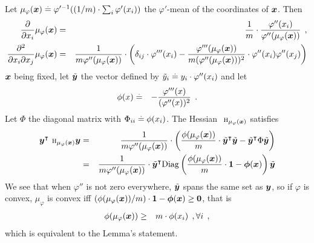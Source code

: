 Let $\mu_\varphi(\bm{x}) \stackrel{\mathrm{.}}{=} \varphi'^{-1}((1/m)\cdot \sum_i
\varphi'(x_i))$ the $\varphi'$-mean of the coordinates of
$\bm{x}$. Then
\begin{eqnarray}
\frac{\partial}{\partial x_i} \mu_\varphi(\bm{x}) & = &
\frac{1}{m}\cdot
\frac{\varphi''(x_i)}{\varphi''(\mu_\varphi(\bm{x}))}\:\:,\\
\frac{\partial^2}{\partial x_i \partial x_j} \mu_\varphi(\bm{x}) & = &
\frac{1}{m \varphi''(\mu_\varphi(\bm{x}))}\cdot \left(\delta_{ij}\cdot
  \varphi'''(x_i)-
  \frac{\varphi'''(\mu_\varphi(\bm{x}))}{m (\varphi''(\mu_\varphi(\bm{x})))^2}\cdot
  \varphi''(x_i) \varphi''(x_j)\right)
\end{eqnarray}
$\bm{x}$ being fixed, let $\tilde{\bm{y}}$ the vector defined by $\tilde{y}_i \stackrel{\mathrm{.}}{=} y_i
\cdot \varphi''(x_i)$ and let
\begin{eqnarray}
\phi(x) & \stackrel{\mathrm{.}}{=} & -\frac{\varphi'''(x)}{(\varphi''(x))^2}\:\:.
\end{eqnarray}
Let $\Phi$ the diagonal matrix with
$\Phi_{ii} \stackrel{\mathrm{.}}{=} \phi(x_i)$. The Hessian $\matrice{h}_{\mu_\varphi(\ve{x})}$ satisfies
\begin{eqnarray}
\ve{y}^\top \matrice{h}_{\mu_\varphi(\ve{x})} \ve{y} & = & \frac{1}{m
  \varphi''(\mu_\varphi(\ve{x}))}\cdot
\left(\frac{\phi(\mu_\varphi(\ve{x}))}{m}\cdot \tilde{\ve{y}}^\top
  \tilde{\ve{y}} - \tilde{\ve{y}}^\top
  \Phi \tilde{\ve{y}} \right)\nonumber\\
 & = & \frac{1}{m
  \varphi''(\mu_\varphi(\ve{x}))}\cdot
\tilde{\ve{y}}^\top \mathrm{Diag}\left(
  \frac{\phi(\mu_\varphi(\ve{x}))}{m}\cdot \ve{1} - \ve{\phi}(\ve{x})\right) \tilde{\ve{y}}
\end{eqnarray}
We see that when $\varphi''$ is
not zero everywhere, $\tilde{\bm{y}}$ spans the same set as $\bm{y}$,
so if $\varphi$ is convex, $\mu_\varphi$ is
convex iff
$(\phi(\mu_\varphi(\bm{x}))/m)\cdot \bm{1} - \bm{\phi}(\bm{x})
\geq \bm{0}$, that is
\begin{eqnarray}
\phi(\mu_\varphi(\bm{x}))& \geq & m \cdot \phi(x_i)\:\:, \forall i\:\:,
\end{eqnarray}
which is equivalent to the Lemma's statement.


